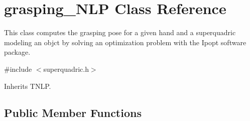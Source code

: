 \section{grasping\+\_\+\+N\+LP Class Reference}
\label{classgrasping__NLP}


This class computes the grasping pose for a given hand and a superquadric modeling an objct by solving an optimization problem with the Ipopt software package.  




{\ttfamily \#include $<$superquadric.\+h$>$}



Inherits T\+N\+LP.

\subsection*{Public Member Functions}
